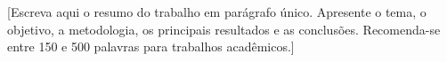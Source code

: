 [Escreva aqui o resumo do trabalho em parágrafo único. Apresente o tema, o objetivo, a metodologia, os principais resultados e as conclusões. Recomenda-se entre 150 e 500 palavras para trabalhos acadêmicos.]

